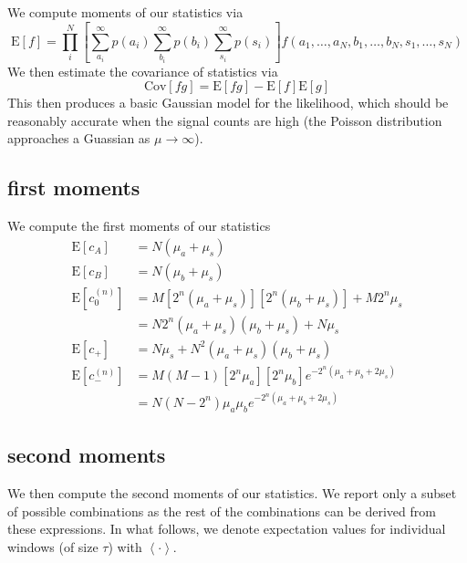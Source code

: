 \documentclass{article}
\begin{document}
We compute moments of our statistics via
\begin{equation}
    \mathrm{E}[f] = \prod\limits_i^N\left[ \sum_{a_i}^\infty p(a_i) \sum_{b_i}^\infty p(b_i) \sum_{s_i}^\infty p(s_i) \right] f(a_1, \ldots, a_N, b_1, \ldots, b_N, s_1, \ldots, s_N)
\end{equation}
We then estimate the covariance of statistics via
\begin{equation}
    \mathrm{Cov}[fg] = \mathrm{E}[fg] - \mathrm{E}[f]\mathrm{E}[g]
\end{equation}
This then produces a basic Gaussian model for the likelihood, which should be reasonably accurate when the signal counts are high (the Poisson distribution approaches a Guassian as $\mu \rightarrow \infty$).


\subsection*{first moments}
\label{sec:first moments}

We compute the first moments of our statistics
\begin{align}
    \mathrm{E}[c_A]
        &= N(\mu_a + \mu_s) \\
    \mathrm{E}[c_B]
        & = N(\mu_b + \mu_s) \\
    \mathrm{E}[c_0^{(n)}]
        & = M [2^n (\mu_a + \mu_s)] [2^n (\mu_b + \mu_s)] + M 2^n \mu_s \nonumber \\
        & = N 2^n (\mu_a + \mu_s)(\mu_b + \mu_s) + N \mu_s \\
    \mathrm{E}[c_+]
        & = N \mu_s + N^2 (\mu_a + \mu_s) (\mu_b + \mu_s) \\
    \mathrm{E}[c_{-}^{(n)}]
         & = M (M-1) [2^n \mu_a] [2^n \mu_b] e^{-2^n (\mu_a + \mu_b + 2\mu_s)} \nonumber \\
         & = N (N - 2^n) \mu_a \mu_b e^{-2^n (\mu_a + \mu_b + 2\mu_s)}
\end{align}


\subsection*{second moments}
\label{sec:second moments}

We then compute the second moments of our statistics.
We report only a subset of possible combinations as the rest of the combinations can be derived from these expressions.
In what follows, we denote expectation values for individual windows (of size $\tau$) with $\left<\cdot\right>$.
\end{document}
